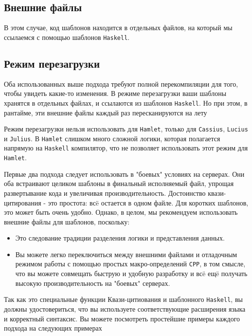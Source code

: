 \subsection {Внешние файлы}
В этом случае, код шаблонов находится в отдельных файлов, на который мы ссылаемся
с помощью шаблонов \texttt{Haskell}.

\subsection {Режим перезагрузки}
Оба использованных выше подхода требуют полной перекомпиляции для того, чтобы увидеть
какие-то изменения. В режиме перезагрузки ваши шаблоны хранятся в отдельных файлах,
и ссылаются из шаблонов \texttt{Haskell}. Но при этом, в рантайме, эти внешние файлы
каждый раз пересканируются на лету

Режим перезагрузки нельзя использовать для \texttt{Hamlet}, только для \texttt{Cassius}, \texttt{Lucius} и \texttt{Julius}.
В \texttt{Hamlet} слишком много сложной логики, которая полагается напрямую на \texttt{Haskell}
компилятор, что не позволяет использовать этот режим для \texttt{Hamlet}.

Первые два подхода следует использовать в "боевых" условиях на серверах.
Они оба встраивают целиком шаблоны в финальный исполняемый файл, упрощая
развертывание кода и увеличивая производительность.
Достоинство квази-цитирования - это простота: всë остается в одном файле.
Для коротких шаблонов, это может быть очень удобно. Однако, в целом, мы рекомендуем
использовать внешние файлы для шаблонов, поскольку:

\begin{itemize}
\item Это следование традиции разделения логики и представления данных.
\item Вы можете легко переключиться между внешними файлами и отладочным режимом
работы с помощью простых макро-определений \texttt{CPP}, в том смысле, что вы
можете совмещать быструю и удобную разработку и всë ещë получать высокую
производительность на "боевых" серверах.
\end{itemize}

Так как это специальные функции Квази-цитиования и шаблонного \texttt{Haskell}, вы
должны удостовериться, что вы используете соответствующие расширения языка
и корректный синтаксис. Вы можете посмотреть простейшие примеры каждого подхода
на следующих примерах



